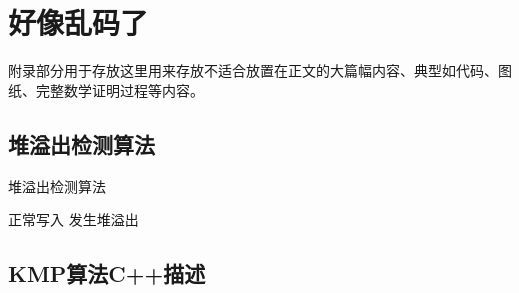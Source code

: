 
\chapter{好像乱码了}

附录部分用于存放这里用来存放不适合放置在正文的大篇幅内容、典型如代码、图纸、完整数学证明过程等内容。

\section{堆溢出检测算法}

\begin{algorithm}[h]
    \caption{堆溢出检测算法}\label{alg:ovf}
    \begin{algorithmic}[1]
            \STATE 正常写入
            \STATE 发生堆溢出
        \ENDIF
    \end{algorithmic}
\end{algorithm}

\section{KMP算法C++描述}

